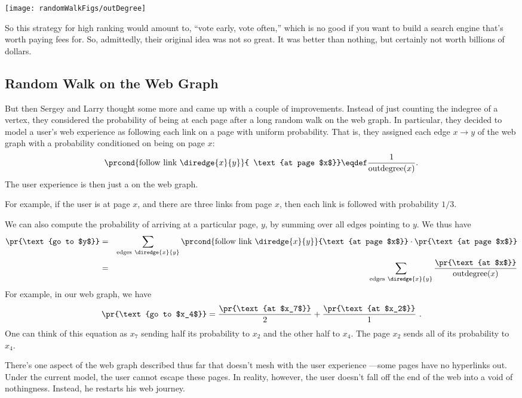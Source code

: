 \texttt{[image: randomWalkFigs/outDegree]}

So this strategy for high ranking would amount to, ``vote early, vote
often,'' which is no good if you want to build a search engine that's
worth paying fees for.  So, admittedly, their original idea was not so
great.  It was better than nothing, but certainly not worth billions of
dollars.

\subsection{Random Walk on the Web Graph}

But then Sergey and Larry thought some more and came up with a couple of
improvements.  Instead of just counting the indegree of a vertex, they
considered the probability of being at each page after a long random walk
on the web graph.  In particular, they decided to model a user's web
experience as following each link on a page with uniform probability.
That is, they assigned each edge $x \rightarrow y$ of the web graph with a
probability conditioned on being on page $x$:
\[
\prcond{\text{follow link}\ \diredge{x}{y}}{ \text{at page $x$}} \eqdef
\frac{1}{\text{outdegree}(x)}.
\]
The user experience is then just a  on the web graph.

For example, if the user is at page $x$, and there are three links from
page $x$, then each link is followed with probability $1/3$.

We can also compute the probability of arriving at a particular page, $y$,
by summing over all edges pointing to $y$.  We thus have
\begin{eqnarray}
  \pr{\text{go to $y$}} &=&  \sum_{\text{edges}\ \diredge{x}{y}}
  \prcond{\text{follow link}\ \diredge{x}{y}}{\text{at page $x$}} \cdot
  \pr{\text{at page $x$}} \nonumber\\
  &=& \sum_{\text{edges}\ \diredge{x}{y}} \frac{\pr{\text{at
      $x$}}}{\text{outdegree}(x)} \label{LN12:stepprob}
\end{eqnarray}
For example, in our web graph, we have
\[ \pr{\text{go to $x_4$}} = \frac{\pr{\text{at $x_7$}}}{2} +
\frac{\pr{\text{at $x_2$}}}{1} \ .
\]
One can think of this equation as $x_7$ sending half its probability to
$x_2$ and the other half to $x_4$. The page $x_2$ sends all of its
probability to $x_4$.

There's one aspect of the web graph described thus far that doesn't mesh
with the user experience ---some pages have no hyperlinks out.  Under the
current model, the user cannot escape these pages.  In reality, however,
the user doesn't fall off the end of the web into a void of nothingness.
Instead, he restarts his web journey.

